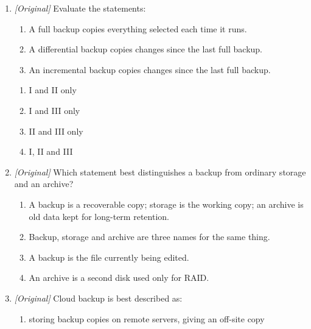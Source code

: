\begin{enumerate}[label=\textbf{Q\arabic*.}, leftmargin=*]
  backup.
  \begin{enumerate}[label=\Alph*.]
    \item Redundant Array of Independent Disks; it provides redundancy but is
      not a backup.
    \item Random Access Internal Disk; it is a backup type.
    \item Redundant Archive of Integrated Disks; it encrypts backups.
    \item Read-Ahead Interface Device; it schedules backups.
  \end{enumerate}
\item \textit{[Original]} Evaluate the statements:
  \begin{enumerate}[label=\Roman*.]
    \item A full backup copies everything selected each time it runs.
    \item A differential backup copies changes since the last full backup.
    \item An incremental backup copies changes since the last full backup.
  \end{enumerate}
  \begin{enumerate}[label=\Alph*.]
    \item I and II only
    \item I and III only
    \item II and III only
    \item I, II and III
  \end{enumerate}
\item \textit{[Original]} Which statement best distinguishes a backup from
  ordinary storage and an archive?
  \begin{enumerate}[label=\Alph*.]
    \item A backup is a recoverable copy; storage is the working copy; an
      archive is old data kept for long-term retention.
    \item Backup, storage and archive are three names for the same thing.
    \item A backup is the file currently being edited.
    \item An archive is a second disk used only for RAID.
  \end{enumerate}
\item \textit{[Original]} Cloud backup is best described as:
  \begin{enumerate}[label=\Alph*.]
    \item storing backup copies on remote servers, giving an off-site copy

\end{enumerate}
\end{enumerate}
